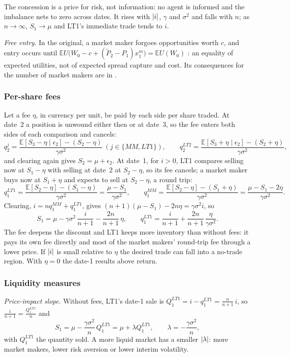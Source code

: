 The concession is a price for risk, not information: no agent is informed and the imbalance nets to zero across dates. It rises with $\left\lvert i\right\rvert$, $\gamma$ and $\sigma^2$ and falls with $n$; as $n\to\infty$, $S_1\to\mu$ and LT1's immediate trade tends to $i$.

\emph{Free entry.} In the original, a market maker forgoes opportunities worth $c$, and entry occurs until $\mathbb{E}U\big(W_0-c+(\tilde P_2-P_1)x_1^m\big)=\mathbb{E}U(W_0)$ \citep[eq.~(16), printed p.~18]{grossman-miller-1988-nber}: an equality of expected utilities, not of expected spread capture and cost. Its consequences for the number of market makers are in .

\subsubsection{Per-share fees}\label{drv:grossman-miller-trading-fees}
Let a fee $\eta$, in currency per unit, be paid by each side per share traded. At date~2 a position is unwound either then or at date~3, so the fee enters both sides of each comparison and cancels:
\[ q_2^{j}=\frac{\mathbb{E}[S_3-\eta\mid\epsilon_2]-(S_2-\eta)}{\gamma\sigma^2}\ (j\in\{MM,LT1\}),\qquad
q_2^{LT2}=\frac{\mathbb{E}[S_3+\eta\mid\epsilon_2]-(S_2+\eta)}{\gamma\sigma^2}, \]
and clearing again gives $S_2=\mu+\epsilon_2$. At date~1, for $i>0$, LT1 compares selling now at $S_1-\eta$ with selling at date~2 at $S_2-\eta$, so its fee cancels; a market maker buys now at $S_1+\eta$ and expects to sell at $S_2-\eta$, a round trip:
\[ q_1^{LT1}=\frac{\mathbb{E}[S_2-\eta]-(S_1-\eta)}{\gamma\sigma^2}=\frac{\mu-S_1}{\gamma\sigma^2},\qquad
q_1^{MM}=\frac{\mathbb{E}[S_2-\eta]-(S_1+\eta)}{\gamma\sigma^2}=\frac{\mu-S_1-2\eta}{\gamma\sigma^2}. \]
Clearing, $i=nq_1^{MM}+q_1^{LT1}$, gives $(n+1)(\mu-S_1)-2n\eta=\gamma\sigma^2 i$, so
\[ S_1=\mu-\gamma\sigma^2\,\frac{i}{n+1}-\frac{2n}{n+1}\,\eta,\qquad
q_1^{LT1}=\frac{i}{n+1}+\frac{2n}{n+1}\,\frac{\eta}{\gamma\sigma^2}. \]
The fee deepens the discount and LT1 keeps more inventory than without fees: it pays its own fee directly and most of the market makers' round-trip fee through a lower price. If $\left\lvert i\right\rvert$ is small relative to $\eta$ the desired trade can fall into a no-trade region. With $\eta=0$ the date-1 results above return.

\subsubsection{Liquidity measures}\label{drv:grossman-miller-liquidity-measures}
\emph{Price-impact slope.} Without fees, LT1's date-1 sale is $Q_1^{LT1}=i-q_1^{LT1}=\frac{n}{n+1}\,i$, so $\frac{i}{n+1}=\frac{Q_1^{LT1}}{n}$ and
\[ S_1=\mu-\frac{\gamma\sigma^2}{n}\,Q_1^{LT1}=\mu+\lambda Q_1^{LT1},\qquad \lambda=-\frac{\gamma\sigma^2}{n}, \]
with $Q_1^{LT1}$ the quantity sold. A more liquid market has a smaller $\left\lvert\lambda\right\rvert$: more market makers, lower risk aversion or lower interim volatility.

